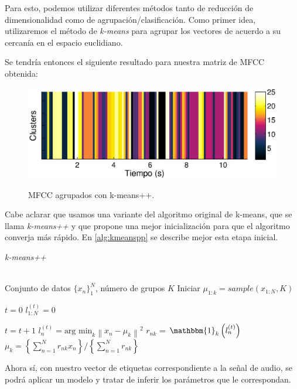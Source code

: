 Para esto, podemos utilizar diferentes métodos tanto de reducción de dimensionalidad como de agrupación/clasificación. Como primer idea, utilizaremos el método de \textit{k-means} para agrupar los vectores de acuerdo a su cercanía en el espacio euclidiano.

Se tendría entonces el siguiente resultado para nuestra matriz de MFCC obtenida:
\begin{figure}[t]
  \myfloatalign
  {\includegraphics[width=0.9\linewidth]{gfx/chap2/mfcc_result4}} \quad
  \caption{MFCC agrupados con k-means++.}
  \label{fig:sign_clusters}
\end{figure}
Cabe aclarar que usamos una variante del algoritmo original de k-means, que se llama \textit{k-means++} \cite{Arthur2007} y que propone una mejor inicialización para que el algoritmo converja más rápido. En \autoref{alg:kmeanspp} se describe mejor esta etapa inicial.

\begin{algorithm}[bth]
   \caption{\textit{k-means++}}
   \label{alg:kmeanspp}
\begin{algorithmic}
    \\ Conjunto de datos $\lbrace x_n \rbrace_1^N $, número de grupos $K$
   \STATE Iniciar $\mu_{1:k} = sample(x_{1:N}, K)$   
   
   \STATE $t = 0$
   \STATE $l_{1:N}^{(t)} = 0$
      
   \REPEAT  
   \STATE $t=t+1$ 
   \STATE $l_n^{(t)} = \text{arg min}_k {\left \| x_n - \mu_k \right \|}^2 $
   \STATE $r_{nk}$ = $\mathbbm{1}_k\left(l_n^{(t)}\right)$
   \STATE $\mu_k = \left\lbrace {\sum_{n=1}^N r_{nk} x_n} \right\rbrace / \left\lbrace {\sum_{n=1}^N r_{nk}} \right\rbrace $
\end{algorithmic}
\end{algorithm}

Ahora sí, con nuestro vector de etiquetas correspondiente a la señal de audio, se podrá aplicar un modelo y tratar de inferir los parámetros que le correspondan.


